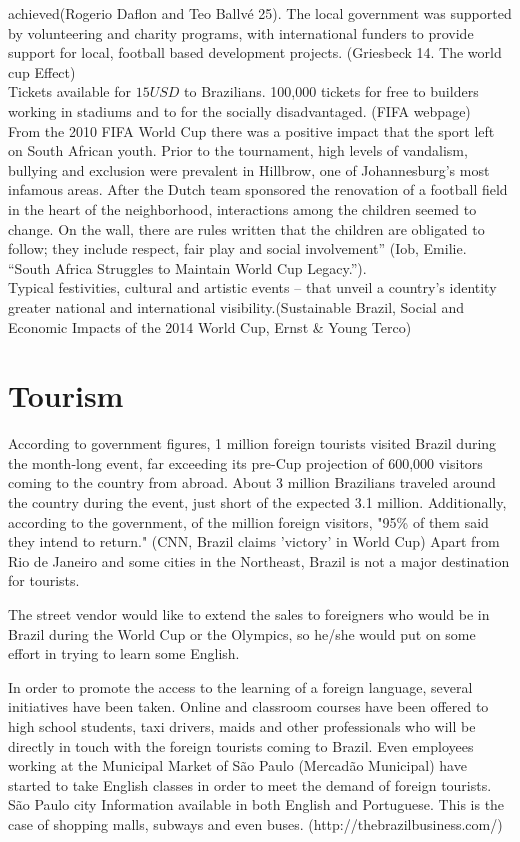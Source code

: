 \documentclass[a4paper,10pt]{report}
\begin{document}
achieved(Rogerio Daflon and Teo Ballvé 25).
The local government was supported by volunteering and charity programs, with international funders
to provide support for local, football based development projects. (Griesbeck 14. The world cup Effect)\\
Tickets available for $15 USD$ to Brazilians. 100,000 tickets for free to builders working in stadiums and to 
for the socially disadvantaged. (FIFA webpage)\\
From the 2010 FIFA World Cup there was a positive impact that the sport left on South African youth.
Prior to the tournament, high levels of vandalism, bullying and exclusion were prevalent in Hillbrow, 
one of Johannesburg’s most infamous areas.  After the Dutch team sponsored the renovation of a 
football field in the heart of the neighborhood, interactions among the children seemed to change.  
On the wall, there are rules written that the children are obligated to follow; they include respect, 
fair play and social involvement” (Iob, Emilie. “South Africa Struggles to Maintain World Cup Legacy.”).\\
Typical festivities, cultural and
artistic events – that unveil a
country’s identity
greater national and international
visibility.(Sustainable Brazil, 
Social and Economic Impacts of the 2014 World Cup, Ernst & Young Terco)\\
\section*{Tourism}
According to government figures, 1 million foreign tourists visited Brazil during the month-long event, far exceeding its pre-Cup projection of 600,000 visitors coming to the country from abroad.
About 3 million Brazilians traveled around the country during the event, just short of the expected 3.1 million.
Additionally, according to the government, of the million foreign visitors, "95\% of them said they intend to return." (CNN, Brazil claims 'victory' in World Cup)
Apart from Rio de Janeiro and some cities in the Northeast, Brazil is not a major destination for tourists. 

The street vendor would like to extend the sales to foreigners 
who would be in Brazil during the World Cup or the Olympics, so he/she would put on some effort 
in trying to learn some English.

In order to promote the access to the learning of a foreign language, 
several initiatives have been taken. 
Online and classroom courses have been offered to high school students, 
taxi drivers, maids and other professionals who will be directly in 
touch with the foreign tourists coming to Brazil. Even employees working 
at the Municipal Market of São Paulo (Mercadão Municipal) have started 
to take English classes in order to meet the demand of foreign tourists.
São Paulo city Information available in both English and Portuguese. 
This is the case of shopping malls, subways and even buses. (http://thebrazilbusiness.com/)
\end{document}
